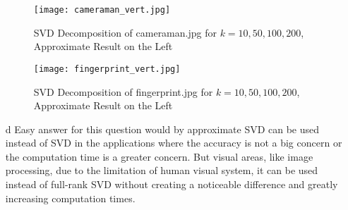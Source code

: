 \documentclass[10pt,a4paper, margin=1in]{article}
\begin{document}
\begin{enumerate}
\begin{figure}[h]
    		\centering
    		\texttt{[image: cameraman\_vert.jpg]}
    		\caption{SVD Decomposition of cameraman.jpg for $k = 10, 50, 100, 200$, Approximate Result on the Left}
  			\label{cameraPhoto}
		\end{figure}
		\begin{figure}[h]
			\centering
			\texttt{[image: fingerprint\_vert.jpg]}
			\caption{SVD Decomposition of fingerprint.jpg for $k = 10, 50, 100, 200$, Approximate Result on the Left}
  			\label{fingerPhoto}
		\end{figure}
    \item[d]
    	Easy answer for this question would by approximate SVD can be used instead of SVD in the applications where the accuracy is not a big concern or the computation time is a greater concern. But visual areas, like image processing, due to the limitation of human visual system, it can be used instead of full-rank SVD without creating a noticeable difference and greatly increasing computation times.
\end{enumerate}
\end{document}
